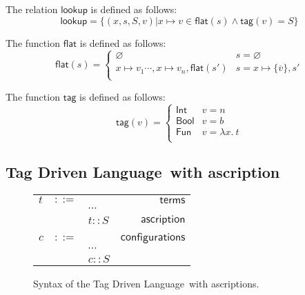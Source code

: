 \documentclass[preprint,authoryear,sort&compress,9pt,nocopyrightspace]{article}
\newcommand{\ascripS}[1]{#1::S}
\newcommand{\absST}[2]{\lambda #1. \ #2}
\newcommand{\lab}{\mathsf{tag}}
\newcommand{\boolt}{\mathsf{Bool}}
\newcommand{\intt}{\mathsf{Int}}
\newcommand{\funt}{\mathsf{Fun}}
\newcommand{\buscar}{\mathsf{lookup}}
\newcommand{\semanticB}{Tag Driven Language}
\begin{document}
\begin{definition}[$\buscar$]
\label{definition:tcs}
\mbox{}
The relation $\buscar$ is defined  as follows:
\[ \buscar  = \{(x, s, S, v)| x \mapsto v \in \mathsf{flat}(s) \wedge \lab(v) = S\}
\]
\end{definition}

\begin{definition}
\label{definition:tcs}
\mbox{}
The function $\mathsf{flat}$ is defined  as follows:
\[ \mathsf{flat}(s) = \begin{cases} 
      \varnothing & s =  \varnothing \\
      x \mapsto v_1 \cdots , x \mapsto v_n,\mathsf{flat} (s') & s = x \mapsto \{\overline{v}\}, s'\\
   \end{cases}
\]
\end{definition}

\begin{definition}[$\lab$]
\label{definition:tcs}
\mbox{}
The function $\lab$ is defined  as follows:
\[ \lab(v) = \begin{cases} 
      \intt & v = n \\
      \boolt & v = b \\
      \funt & v = \absST{x}{t}\\
   \end{cases}
\]
\end{definition}

\subsection{\semanticB \ with ascription}

\setlength{\topmargin}{-25mm}
\setlength{\textheight}{230mm}
\begin{figure}[h]
\begin{small}
\begin{center}
\hspace*{-2cm}
\begin{tabular}{|l c l r|}
\hline
$t$&$::=$&&$\mathsf {terms}$\\
&&$\cdots$&\\
&&$\ascripS{t}$&$\mathsf {ascription}$\\
&&&\\
$c$&$::=$&&$\mathsf {configurations}$\\
&&$\cdots$&\\
&&$\ascripS{c}$&\\
\hline
\end{tabular}
\hspace*{-2cm}
\caption{Syntax of the \semanticB \ with ascriptions.}
\label{figure:sencilla}
\end{center}
\end{small}
\end{figure}
\end{document}
